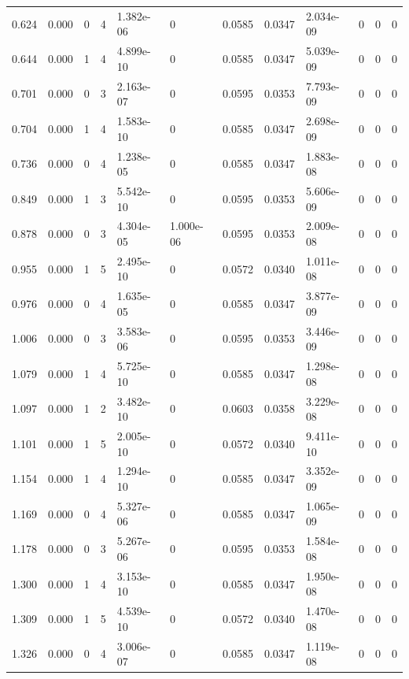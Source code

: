 \documentclass[preview]{standalone}
\begin{document}
{{\begin{tabular}{L{1.2cm}C{1.2cm} C{0.3cm}C{0.5cm} C{1.4cm}C{1.4cm} C{1.4cm}C{1.4cm} C{1.6cm}C{1.6cm} C{1.6cm}C{1.6cm}}
  0.624  &  0.000  & 0     &  4 &  1.382e-06  & 0  &  0.0585&   0.0347& 2.034e-09 & 0   &  0 & 0  \\ 
  0.644  &  0.000  & 1     &  4 &  4.899e-10  & 0  &  0.0585&   0.0347& 5.039e-09 & 0   &  0 & 0  \\ 
  0.701  &  0.000  & 0     &  3 &  2.163e-07  & 0  &  0.0595&   0.0353& 7.793e-09 & 0   &  0 & 0  \\ 
  0.704  &  0.000  & 1     &  4 &  1.583e-10  & 0  &  0.0585&   0.0347& 2.698e-09 & 0   &  0 & 0  \\ 
  0.736  &  0.000  & 0     &  4 &  1.238e-05  & 0  &  0.0585&   0.0347& 1.883e-08 & 0   &  0 & 0  \\ 
  0.849  &  0.000  & 1     &  3 &  5.542e-10  & 0  &  0.0595&   0.0353& 5.606e-09 & 0   &  0 & 0  \\ 
  0.878  &  0.000  & 0     &  3 &  4.304e-05  & 1.000e-06  &  0.0595&   0.0353& 2.009e-08 & 0   &  0 & 0  \\ 
  0.955  &  0.000  & 1     &  5 &  2.495e-10  & 0  &  0.0572&   0.0340& 1.011e-08 & 0   &  0 & 0  \\ 
  0.976  &  0.000  & 0     &  4 &  1.635e-05  & 0  &  0.0585&   0.0347& 3.877e-09 & 0   &  0 & 0  \\ 
  1.006  &  0.000  & 0     &  3 &  3.583e-06  & 0  &  0.0595&   0.0353& 3.446e-09 & 0   &  0 & 0  \\ 
  1.079  &  0.000  & 1     &  4 &  5.725e-10  & 0  &  0.0585&   0.0347& 1.298e-08 & 0   &  0 & 0  \\ 
  1.097  &  0.000  & 1     &  2 &  3.482e-10  & 0  &  0.0603&   0.0358& 3.229e-08 & 0   &  0 & 0  \\ 
  1.101  &  0.000  & 1     &  5 &  2.005e-10  & 0  &  0.0572&   0.0340& 9.411e-10 & 0   &  0 & 0  \\ 
  1.154  &  0.000  & 1     &  4 &  1.294e-10  & 0  &  0.0585&   0.0347& 3.352e-09 & 0   &  0 & 0  \\ 
  1.169  &  0.000  & 0     &  4 &  5.327e-06  & 0  &  0.0585&   0.0347& 1.065e-09 & 0   &  0 & 0  \\ 
  1.178  &  0.000  & 0     &  3 &  5.267e-06  & 0  &  0.0595&   0.0353& 1.584e-08 & 0   &  0 & 0  \\ 
  1.300  &  0.000  & 1     &  4 &  3.153e-10  & 0  &  0.0585&   0.0347& 1.950e-08 & 0   &  0 & 0  \\ 
  1.309  &  0.000  & 1     &  5 &  4.539e-10  & 0  &  0.0572&   0.0340& 1.470e-08 & 0   &  0 & 0  \\ 
  1.326  &  0.000  & 0     &  4 &  3.006e-07  & 0  &  0.0585&   0.0347& 1.119e-08 & 0   &  0 & 0  \\ 

\end{tabular}}}
\end{document}
